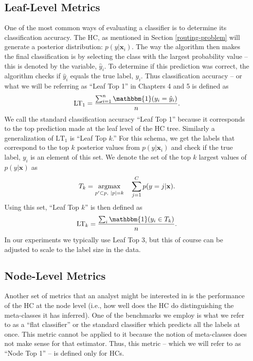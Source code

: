 \documentclass[../thesis.tex]{subfiles}
\begin{document}
\subsection{Leaf-Level Metrics}
One of the most common ways of evaluating a classifier is to determine its
classification accuracy. The HC, as mentioned in Section \ref{routing-problem}
will generate a posterior distribution: $p(y | \mathbf{x}_i)$. The way the
algorithm then makes the final classification is by selecting the class with the
largest probability value -- this is denoted by the variable, $\hat{y}_i$. To
determine if this prediction was correct, the algorithm checks if $\hat{y}_i$
equals the true label, $y_i$. Thus classification accuracy -- or what we will be
referring as ``Leaf Top 1'' in Chapters 4 and 5 is defined as
\begin{equation}
    \text{LT}_1 = \frac{\sum_{i=1}^n \mathbbm{1}(y_i = \hat{y}_i)}{n}.
\end{equation}
We call the standard classification accuracy ``Leaf Top 1'' because it
corresponds to the top prediction made at the leaf level of the HC tree.
Similarly a generalization of $\text{LT}_1$ is ``Leaf Top $k$.'' For this
schema, we get the labels that correspond to the top $k$ posterior values from
$p(y | \mathbf{x}_i)$ and check if the true label, $y_i$ is an element of this
set. We denote the set of the top $k$ largest values of $p(y | \mathbf{x})$ as
\begin{equation*}
    T_k = \underset{p^\prime \subset p, \ |p| = k}{\argmax} \quad \sum_{j=1}^C
    p(y = j | \mathbf{x}).
\end{equation*}
Using this set, ``Leaf Top $k$'' is then defined as
\begin{equation}
    \text{LT}_k = \frac{\sum_i \mathbbm{1}(y_i \in T_k)}{n}.
\end{equation}
In our experiments we typically use Leaf Top 3, but this of course can be
adjusted to scale to the label size in the data.

\subsection{Node-Level Metrics}
Another set of metrics that an analyst might be interested in is the performance
of the HC at the node level (i.e., how well does the HC do distinguishing the
meta-classes it has inferred). One of the benchmarks we employ is what we refer
to as a ``flat classifier'' or the standard classifier which predicts all the
labels at once. This metric cannot be applied to it because the notion of
meta-classes does not make sense for that estimator. Thus, this metric -- which
we will refer to as ``Node Top 1'' -- is defined only for HCs.
\end{document}
